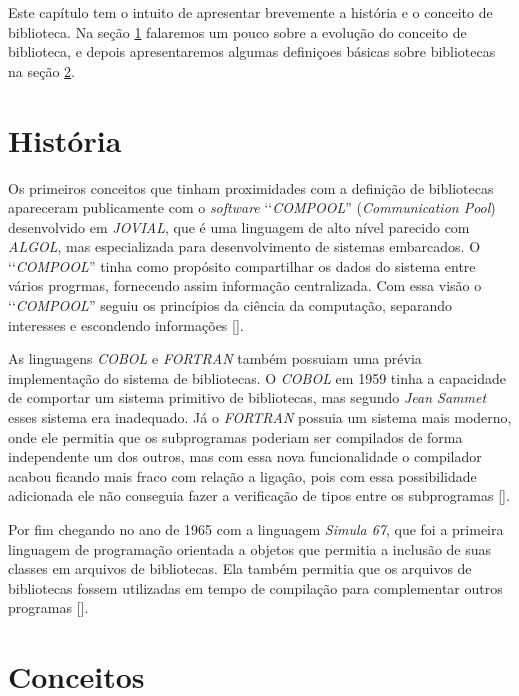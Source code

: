 Este capítulo tem o intuito de apresentar brevemente a história e o conceito de biblioteca. Na seção
\ref{section:historia_biblioteca} falaremos um pouco sobre a evolução do conceito de biblioteca, e
depois apresentaremos algumas definiçoes básicas sobre bibliotecas na seção \ref{section:conceitos}.

\section{História}
\label{section:historia_biblioteca}

Os primeiros conceitos que tinham proximidades com a definição de bibliotecas apareceram publicamente
com o \emph{software} ‘‘\emph{COMPOOL}'' (\emph{Communication Pool}) desenvolvido em \emph{JOVIAL},
que é uma linguagem de alto nível parecido com \emph{ALGOL}, mas especializada para desenvolvimento
de sistemas embarcados. O ‘‘\emph{COMPOOL}'' tinha como propósito compartilhar os dados do
sistema entre vários progrmas, fornecendo assim informação centralizada. Com essa visão o
‘‘\emph{COMPOOL}'' seguiu os princípios da ciência da computação, separando interesses e
escondendo informações [].

As linguagens \emph{COBOL} e \emph{FORTRAN} também possuiam uma prévia implementação do sistema de
bibliotecas. O \emph{COBOL} em 1959 tinha a capacidade de comportar um sistema primitivo de
bibliotecas, mas segundo \emph{Jean Sammet} esses sistema era inadequado. Já o
\emph{FORTRAN} possuia um sistema mais moderno, onde ele permitia que os subprogramas poderiam ser
compilados de forma independente um dos outros, mas com essa nova funcionalidade o compilador acabou
ficando mais fraco com relação a ligação, pois com essa possibilidade adicionada ele não conseguia
fazer a verificação de tipos entre os subprogramas [].

Por fim chegando no ano de 1965 com a linguagem \emph{Simula 67}, que foi a primeira linguagem
de programação orientada a objetos que permitia a inclusão de suas classes em arquivos de bibliotecas.
Ela também permitia que os arquivos de bibliotecas fossem utilizadas em tempo de compilação para
complementar outros programas [].

\section{Conceitos}
\label{section:conceitos}

